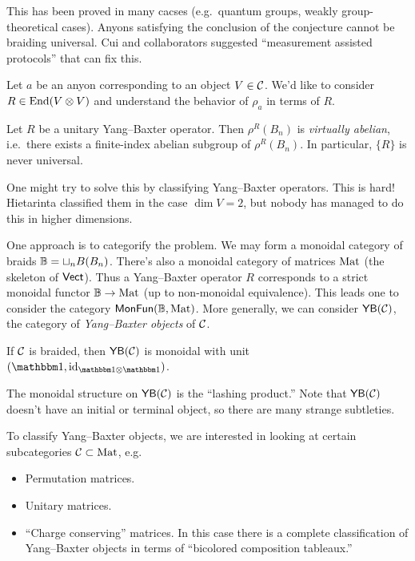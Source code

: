 \documentclass{amsart}
\begin{document}
This has been proved in many cacses (e.g.\ quantum groups, weakly group-theoretical cases).
Anyons satisfying the conclusion of the conjecture cannot be braiding universal.
Cui and collaborators suggested ``measurement assisted protocols'' that can fix this.

Let $a$ be an anyon corresponding to an object $V \in \mathcal{C}$.
We'd like to consider $R \in \operatorname{End}(V \otimes V)$ and understand the behavior of $\rho_a$ in terms of $R$.

\begin{conj}
  Let $R$ be a unitary Yang--Baxter operator.
  Then $\rho^R(B_n)$ is \emph{virtually abelian}, i.e.\ there exists a finite-index abelian subgroup of $\rho^R(B_n)$.
  In particular, $\{ R \}$ is never universal.
\end{conj}

One might try to solve this by classifying Yang--Baxter operators.
This is hard!
Hietarinta classified them in the case $\dim V = 2$, but nobody has managed to do this in higher dimensions.

One approach is to categorify the problem.
We may form a monoidal category of braids $\mathbb{B} = \sqcup_n B(B_n)$.
There's also a monoidal category of matrices $\operatorname{Mat}$ (the skeleton of $\mathsf{Vect}$).
Thus a Yang--Baxter operator $R$ corresponds to a strict monoidal functor $\mathbb{B} \to \operatorname{Mat}$ (up to non-monoidal equivalence).
This leads one to consider the category $\operatorname{\mathsf{MonFun}}(\mathbb{B}, \operatorname{Mat})$.
More generally, we can consider $\operatorname{\mathsf{YB}}(\mathcal{C})$, the category of \emph{Yang--Baxter objects} of $\mathcal{C}$.

\begin{thm}
  If $\mathcal{C}$ is braided, then $\operatorname{\mathsf{YB}}(\mathcal{C})$ is monoidal with unit $(\onebb, \id_{\onebb \otimes \onebb})$.
\end{thm}

The monoidal structure on $\operatorname{\mathsf{YB}}(\mathcal{C})$ is the ``lashing product.''
Note that $\operatorname{\mathsf{YB}}(\mathcal{C})$ doesn't have an initial or terminal object, so there are many strange subtleties.

To classify Yang--Baxter objects, we are interested in looking at certain subcategories $\mathcal{C} \subset \operatorname{Mat}$, e.g.\
\begin{itemize}
  \item Permutation matrices.
  \item Unitary matrices.
  \item ``Charge conserving'' matrices.
    In this case there is a complete classification of Yang--Baxter objects in terms of ``bicolored composition tableaux.''
\end{itemize}
\end{document}

